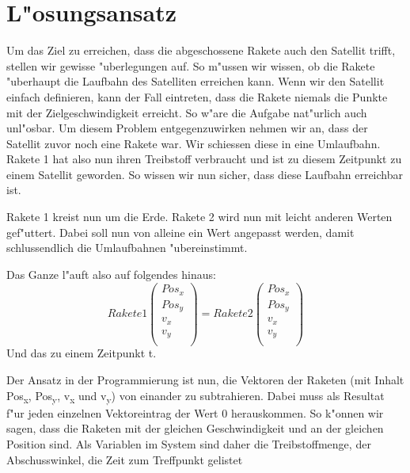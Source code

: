 \documentclass[11pt]{report}
\begin{document}
\newpage
\section{L"osungsansatz}
Um das Ziel zu erreichen, dass die abgeschossene Rakete auch den Satellit trifft, stellen wir gewisse "uberlegungen auf. So m"ussen wir wissen, ob die Rakete "uberhaupt die Laufbahn des Satelliten erreichen kann. Wenn wir den Satellit einfach definieren, kann der Fall eintreten, dass die Rakete niemals die Punkte mit der Zielgeschwindigkeit erreicht. So w"are die Aufgabe nat"urlich auch unl"osbar. Um diesem Problem entgegenzuwirken nehmen wir an, dass der Satellit zuvor noch eine Rakete war. Wir schiessen diese in eine Umlaufbahn. Rakete 1 hat also nun ihren Treibstoff verbraucht und ist zu diesem Zeitpunkt zu einem Satellit geworden. So wissen wir nun sicher, dass diese Laufbahn erreichbar ist.
\linebreak

Rakete 1 kreist nun um die Erde. Rakete 2 wird nun mit leicht anderen Werten gef"uttert. Dabei soll nun von alleine ein Wert angepasst werden, damit schlussendlich die Umlaufbahnen "ubereinstimmt.
\linebreak

Das Ganze l"auft also auf folgendes hinaus:
\begin{equation}
Rakete 1
\left(\begin{array}{c}
Pos_{x} \\
Pos_{y} \\
v_{x} 	\\
v_{y}	\\
\end{array}\right)
=
Rakete 2
\left(\begin{array}{c}
Pos_{x} \\
Pos_{y} \\
v_{x} 	\\
v_{y}	\\
\end{array}\right)
\end{equation}
Und das zu einem Zeitpunkt t.
\linebreak

Der Ansatz in der Programmierung ist nun, die Vektoren der Raketen (mit Inhalt Pos\textsubscript{x}, Pos\textsubscript{y}, v\textsubscript{x} und v\textsubscript{y}) von einander zu subtrahieren. Dabei muss als Resultat f"ur jeden einzelnen Vektoreintrag der Wert 0 herauskommen. So k"onnen wir sagen, dass die Raketen mit der gleichen Geschwindigkeit und an der gleichen Position sind. Als Variablen im System sind daher die Treibstoffmenge, der Abschusswinkel, die Zeit zum Treffpunkt gelistet
\end{document}
